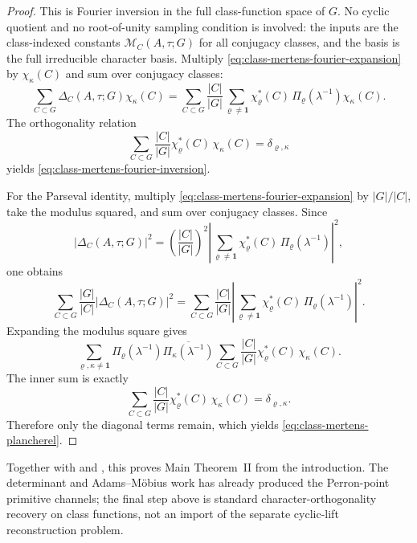 \documentclass[11pt,a4paper]{amsart}
\theoremstyle{plain}
\theoremstyle{definition}
\theoremstyle{remark}
\begin{document}
\begin{proof}
  This is Fourier inversion in the full class-function space of \(G\).
  No cyclic quotient and no root-of-unity sampling condition is involved:
  the inputs are the class-indexed constants
  \(\mathcal M_C(A,\tau;G)\) for all conjugacy classes, and the basis is
  the full irreducible character basis.
  Multiply \eqref{eq:class-mertens-fourier-expansion} by
  \(\chi_\kappa(C)\) and sum over conjugacy classes:
  \[
    \sum_{C\subset G}\Delta_C(A,\tau;G)\chi_\kappa(C)
    =
    \sum_{C\subset G}\frac{|C|}{|G|}
      \sum_{\varrho\neq\mathbf 1}
        \chi_\varrho^\ast(C)\,
        \Pi_\varrho(\lambda^{-1})\chi_\kappa(C).
  \]
  The orthogonality relation
  \[
    \sum_{C\subset G}\frac{|C|}{|G|}
      \chi_\varrho^\ast(C)\,\chi_\kappa(C)
    =\delta_{\varrho,\kappa}
  \]
  yields \eqref{eq:class-mertens-fourier-inversion}.

  For the Parseval identity, multiply
  \eqref{eq:class-mertens-fourier-expansion} by \(|G|/|C|\), take the
  modulus squared, and sum over conjugacy classes. Since
  \[
    |\Delta_C(A,\tau;G)|^2
    =
    \left(\frac{|C|}{|G|}\right)^2
    \left|\sum_{\varrho\neq\mathbf 1}
      \chi_\varrho^\ast(C)\,
      \Pi_\varrho(\lambda^{-1})\right|^2,
  \]
  one obtains
  \[
    \sum_{C\subset G}\frac{|G|}{|C|}|\Delta_C(A,\tau;G)|^2
    =
    \sum_{C\subset G}\frac{|C|}{|G|}
      \left|\sum_{\varrho\neq\mathbf 1}
        \chi_\varrho^\ast(C)\,
        \Pi_\varrho(\lambda^{-1})\right|^2.
  \]
  Expanding the modulus square gives
  \[
    \sum_{\varrho,\kappa\neq\mathbf 1}
      \Pi_\varrho(\lambda^{-1})
      \overline{\Pi_\kappa(\lambda^{-1})}
      \sum_{C\subset G}\frac{|C|}{|G|}
        \chi_\varrho^\ast(C)\,\chi_\kappa(C).
  \]
  The inner sum is exactly
  \[
    \sum_{C\subset G}\frac{|C|}{|G|}
      \chi_\varrho^\ast(C)\,\chi_\kappa(C)
    =\delta_{\varrho,\kappa}.
  \]
  Therefore only the diagonal terms remain, which
  yields \eqref{eq:class-mertens-plancherel}.
\end{proof}

\noindent
Together with  and
, this proves Main Theorem~II from
the introduction. The determinant and Adams--M\"obius work has already
produced the Perron-point primitive channels; the final step above is
standard character-orthogonality recovery on class functions, not an import of
the separate cyclic-lift reconstruction problem.
\end{document}
